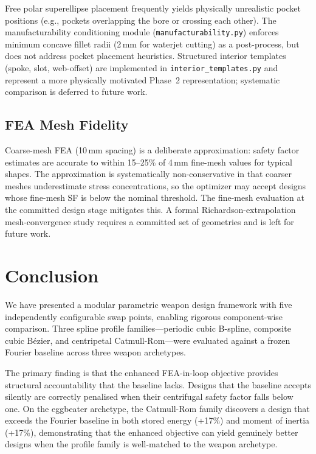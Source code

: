 \documentclass[10pt,twocolumn]{article}
\begin{document}
Free polar superellipse placement frequently yields physically unrealistic
pocket positions (e.g., pockets overlapping the bore or crossing each other).
The manufacturability conditioning module (\texttt{manufacturability.py})
enforces minimum concave fillet radii (2\,mm for waterjet cutting) as a
post-process, but does not address pocket placement heuristics.  Structured
interior templates (spoke, slot, web-offset) are implemented in
\texttt{interior\_templates.py} and represent a more physically motivated
Phase~2 representation; systematic comparison is deferred to future work.

\subsection{FEA Mesh Fidelity}
\label{sec:discuss_fea}

Coarse-mesh FEA (10\,mm spacing) is a deliberate approximation: safety factor
estimates are accurate to within 15--25\% of 4\,mm fine-mesh values for
typical shapes.  The approximation is systematically non-conservative in that
coarser meshes underestimate stress concentrations, so the optimizer may accept
designs whose fine-mesh SF is below the nominal threshold.  The fine-mesh
evaluation at the committed design stage mitigates this.  A formal
Richardson-extrapolation mesh-convergence study requires a committed set of
geometries and is left for future work.

\section{Conclusion}
\label{sec:conclusion}

We have presented a modular parametric weapon design framework with five
independently configurable swap points, enabling rigorous component-wise
comparison.  Three spline profile families---periodic cubic B-spline,
composite cubic B\'{e}zier, and centripetal Catmull-Rom---were evaluated
against a frozen Fourier baseline across three weapon archetypes.

The primary finding is that the enhanced FEA-in-loop objective provides
structural accountability that the baseline lacks.  Designs that the baseline
accepts silently are correctly penalised when their centrifugal safety factor
falls below one.  On the eggbeater archetype, the Catmull-Rom family discovers
a design that exceeds the Fourier baseline in both stored energy (+17\%) and
moment of inertia (+17\%), demonstrating that the enhanced objective can yield
genuinely better designs when the profile family is well-matched to the weapon
archetype.
\end{document}

